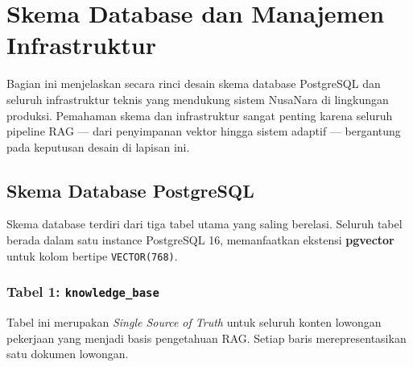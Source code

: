 
\section{Skema Database dan Manajemen Infrastruktur}
\label{sec:database_infrastruktur}

Bagian ini menjelaskan secara rinci desain skema database PostgreSQL dan seluruh
infrastruktur teknis yang mendukung sistem NusaNara di lingkungan produksi.
Pemahaman skema dan infrastruktur sangat penting karena seluruh pipeline RAG ---
dari penyimpanan vektor hingga sistem adaptif --- bergantung pada keputusan desain
di lapisan ini.

\subsection{Skema Database PostgreSQL}
\label{subsec:db_schema}

Skema database terdiri dari tiga tabel utama yang saling berelasi. Seluruh tabel
berada dalam satu instance PostgreSQL 16, memanfaatkan ekstensi \textbf{pgvector}
untuk kolom bertipe \texttt{VECTOR(768)}.

\subsubsection{Tabel 1: \texttt{knowledge\_base}}

Tabel ini merupakan \textit{Single Source of Truth} untuk seluruh konten lowongan
pekerjaan yang menjadi basis pengetahuan RAG. Setiap baris merepresentasikan satu
dokumen lowongan.

